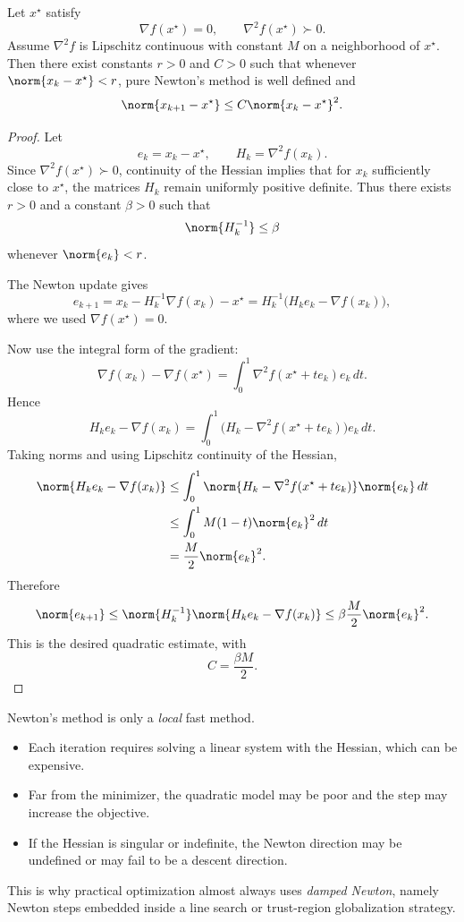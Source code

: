\begin{theorem}\label{thm:l2-local-quadratic-convergence-of-newton-s-method}
	Let $x^\star$ satisfy
	\[
		\nabla f(x^\star)=0,
		\qquad
		\nabla^2 f(x^\star)\succ 0.
	\]
	Assume $\nabla^2 f$ is Lipschitz continuous with constant $M$ on a neighborhood of $x^\star$. Then there exist constants $r>0$ and $C>0$ such that whenever $\norm{x_k-x^\star}<r$, pure Newton's method is well defined and
	\[
		\norm{x_{k+1}-x^\star}\le C \norm{x_k-x^\star}^2.
	\]
\end{theorem}
\begin{proof}
	Let
	\[
		e_k=x_k-x^\star,
		\qquad
		H_k=\nabla^2 f(x_k).
	\]
	Since $\nabla^2 f(x^\star)\succ 0$, continuity of the Hessian implies that for $x_k$ sufficiently close to $x^\star$, the matrices $H_k$ remain uniformly positive definite. Thus there exists $r>0$ and a constant $\beta>0$ such that
	\[
		\norm{H_k^{-1}}\le \beta
	\]
	whenever $\norm{e_k}<r$.

	The Newton update gives
	\[
		e_{k+1}
		=
		x_k-H_k^{-1}\nabla f(x_k)-x^\star
		=
		H_k^{-1}\bigl(H_ke_k-\nabla f(x_k)\bigr),
	\]
	where we used $\nabla f(x^\star)=0$.

	Now use the integral form of the gradient:
	\[
		\nabla f(x_k)-\nabla f(x^\star)
		=
		\int_0^1 \nabla^2 f(x^\star+t e_k)e_k\,dt.
	\]
	Hence
	\[
		H_k e_k-\nabla f(x_k)
		=
		\int_0^1 \bigl(H_k-\nabla^2 f(x^\star+t e_k)\bigr)e_k\,dt.
	\]
	Taking norms and using Lipschitz continuity of the Hessian,
	\begin{align*}
		\norm{H_ke_k-\nabla f(x_k)}
		 & \le \int_0^1 \norm{H_k-\nabla^2 f(x^\star+t e_k)} \norm{e_k}\,dt \\
		 & \le \int_0^1 M(1-t)\norm{e_k}^2\,dt \\
		 & = \frac{M}{2}\norm{e_k}^2.
	\end{align*}
	Therefore
	\[
		\norm{e_{k+1}}
		\le
		\norm{H_k^{-1}} \norm{H_ke_k-\nabla f(x_k)}
		\le
		\beta \frac{M}{2}\norm{e_k}^2.
	\]
	This is the desired quadratic estimate, with
	\[
		C=\frac{\beta M}{2}.
	\]
\end{proof}

\begin{remark}
	Newton's method is only a \emph{local} fast method.
	\begin{itemize}
		\item Each iteration requires solving a linear system with the Hessian, which can be expensive.
		\item Far from the minimizer, the quadratic model may be poor and the step may increase the objective.
		\item If the Hessian is singular or indefinite, the Newton direction may be undefined or may fail to be a descent direction.
	\end{itemize}
	This is why practical optimization almost always uses \emph{damped Newton}, namely Newton steps embedded inside a line search or trust-region globalization strategy.
\end{remark}


